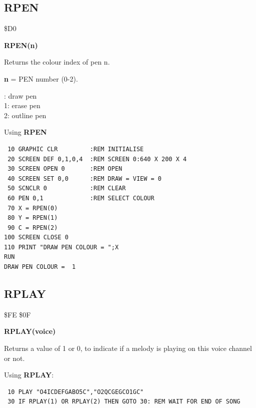 \subsection{RPEN}
\begin{description}[leftmargin=2cm,style=nextline]
\item [Token:] \$D0
\item [Format:] {\bf RPEN(n)}
\item [Usage:]  Returns the colour index of pen n.

                {\bf n} = PEN number (0-2).

{: draw pen \\
                1: erase pen \\
                2: outline pen
}

\item [Example:] Using {\bf RPEN}

\begin{tcolorbox}[colback=black,coltext=white]
\verbatimfont{\codefont}
\begin{verbatim}
 10 GRAPHIC CLR         :REM INITIALISE
 20 SCREEN DEF 0,1,0,4  :REM SCREEN 0:640 X 200 X 4
 30 SCREEN OPEN 0       :REM OPEN
 40 SCREEN SET 0,0      :REM DRAW = VIEW = 0
 50 SCNCLR 0            :REM CLEAR
 60 PEN 0,1             :REM SELECT COLOUR
 70 X = RPEN(0)
 80 Y = RPEN(1)
 90 C = RPEN(2)
100 SCREEN CLOSE 0
110 PRINT "DRAW PEN COLOUR = ";X
RUN
DRAW PEN COLOUR =  1
\end{verbatim}
\end{tcolorbox}
\end{description}


\newpage
\subsection{RPLAY}
\begin{description}[leftmargin=2cm,style=nextline]
\item [Token:] \$FE \$0F
\item [Format:] {\bf RPLAY(voice)}
\item [Usage:] Returns a value of 1 or 0, to indicate if a melody is playing on this voice channel or not.

\item [Example:] Using {\bf RPLAY}:
\begin{tcolorbox}[colback=black,coltext=white]
\verbatimfont{\codefont}
\begin{verbatim}
 10 PLAY "O4ICDEFGABO5C","O2QCGEGCO1GC"
 30 IF RPLAY(1) OR RPLAY(2) THEN GOTO 30: REM WAIT FOR END OF SONG
\end{verbatim}
\end{tcolorbox}
\end{description}

